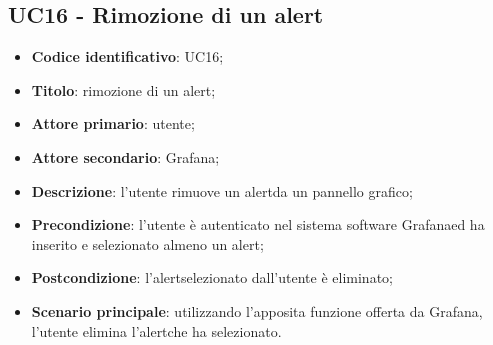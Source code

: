 \subsection{UC16 - Rimozione di un alert}
\begin{itemize}
	\item \textbf{Codice identificativo}: UC16;
	\item \textbf{Titolo}: rimozione di un alert\glo;
	\item \textbf{Attore primario}: utente;
	\item \textbf{Attore secondario}: Grafana\glo;
	\item \textbf{Descrizione}: l'utente rimuove un alert\glosp da un pannello grafico;
	\item \textbf{Precondizione}: l'utente è autenticato nel sistema software Grafana\glosp ed ha inserito e selezionato almeno un alert\glo;
	\item \textbf{Postcondizione}: l'alert\glosp selezionato dall'utente è eliminato;
	\item \textbf{Scenario principale}: utilizzando l'apposita funzione offerta da Grafana\glo, l'utente elimina l'alert\glosp che ha selezionato.
\end{itemize} 
